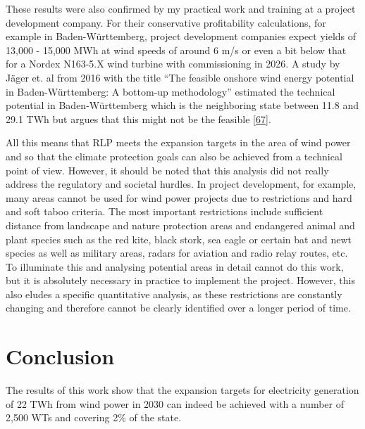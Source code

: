 \documentclass[a4paper,11pt]{article}
\begin{document}
These results were also confirmed by my practical work and training at a project development company. For their conservative profitability calculations, for example in Baden-Württemberg, project development companies expect yields of 13,000 - 15,000 MWh at wind speeds of around 6 m/s or even a bit below that for a Nordex N163-5.X wind turbine with commissioning in 2026. A study by Jäger et. al from 2016 with the title ``The feasible onshore wind energy potential in Baden-Württemberg: A bottom-up methodology'' estimated the technical potential in Baden-Württemberg which is the neighboring state between 11.8 and 29.1 TWh but argues that this might not be the feasible {[}\protect\hyperlink{ref-Jager.2016}{67}{]}.

\newpage

All this means that RLP meets the expansion targets in the area of wind power and so that the climate protection goals can also be achieved from a technical point of view. However, it should be noted that this analysis did not really address the regulatory and societal hurdles. In project development, for example, many areas cannot be used for wind power projects due to restrictions and hard and soft taboo criteria. The most important restrictions include sufficient distance from landscape and nature protection areas and endangered animal and plant species such as the red kite, black stork, sea eagle or certain bat and newt species as well as military areas, radars for aviation and radio relay routes, etc. To illuminate this and analysing potential areas in detail cannot do this work, but it is absolutely necessary in practice to implement the project. However, this also eludes a specific quantitative analysis, as these restrictions are constantly changing and therefore cannot be clearly identified over a longer period of time.

\newpage

\hypertarget{conclusion}{%
\section{Conclusion}\label{conclusion}}

The results of this work show that the expansion targets for electricity generation of 22 TWh from wind power in 2030 can indeed be achieved with a number of 2,500 WTs and covering 2\% of the state.
\end{document}
